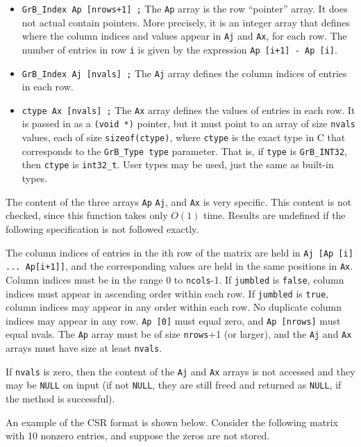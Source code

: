 \documentclass[12pt]{article}
\begin{document}
\begin{itemize}
\item \verb'GrB_Index Ap [nrows+1] ;'  The \verb'Ap' array is the row
``pointer'' array.  It does not actual contain pointers.  More precisely, it is
an integer array that defines where the column indices and values appear in
\verb'Aj' and \verb'Ax', for each row.  The number of entries in row \verb'i'
is given by the expression \verb'Ap [i+1] - Ap [i]'.

\item \verb'GrB_Index Aj [nvals] ;'  The \verb'Aj' array defines the
column indices of entries in each row.

\item \verb'ctype Ax [nvals] ;'  The \verb'Ax' array defines the values of
entries in each row.  It is passed in as a \verb'(void *)' pointer, but it must
point to an array of size \verb'nvals' values, each of size
\verb'sizeof(ctype)', where \verb'ctype' is the exact type in C that corresponds
to the \verb'GrB_Type type' parameter.  That is, if \verb'type' is
\verb'GrB_INT32', then \verb'ctype' is \verb'int32_t'.  User types
may be used, just the same as built-in types.
\end{itemize}

The content of the three arrays \verb'Ap' \verb'Aj', and \verb'Ax' is very
specific.  This content is not checked, since this function takes only
$O(1)$ time.  Results are undefined if the following specification is not
followed exactly.

The column indices of entries in the ith row of the matrix are held in
\verb'Aj [Ap [i] ... Ap[i+1]]', and the corresponding values are held in the
same positions in \verb'Ax'.  Column indices must be in the range 0 to
\verb'ncols'-1.  If \verb'jumbled' is \verb'false', column indices must appear
in ascending order within each row.  If \verb'jumbled' is \verb'true', column
indices may appear in any order within each row.  No duplicate column indices
may appear in any row.  \verb'Ap [0]' must equal zero, and \verb'Ap [nrows]'
must equal nvals.  The \verb'Ap' array must be of size \verb'nrows'+1 (or
larger), and the \verb'Aj' and \verb'Ax' arrays must have size at least
\verb'nvals'.

If \verb'nvals' is zero, then the content of the \verb'Aj' and \verb'Ax' arrays
is not accessed and they may be \verb'NULL' on input (if not \verb'NULL', they
are still freed and returned as \verb'NULL', if the method is successful).

An example of the CSR format is shown below.  Consider the following
matrix with 10 nonzero entries, and suppose the zeros are not stored.
\end{document}

